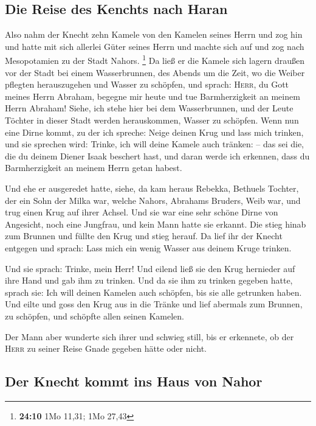 \hypertarget{die-reise-des-kenchts-nach-haran}{%
\subsection{Die Reise des Kenchts nach
Haran}\label{die-reise-des-kenchts-nach-haran}}

 Also nahm der Knecht zehn Kamele von den Kamelen seines
Herrn und zog hin und hatte mit sich allerlei Güter seines Herrn und
machte sich auf und zog nach Mesopotamien zu der Stadt Nahors.
\footnote{\textbf{24:10} 1Mo 11,31; 1Mo 27,43}  Da ließ
er die Kamele sich lagern draußen vor der Stadt bei einem Wasserbrunnen,
des Abends um die Zeit, wo die Weiber pflegten herauszugehen und Wasser
zu schöpfen,  und sprach: \textsc{Herr}, du Gott meines
Herrn Abraham, begegne mir heute und tue Barmherzigkeit an meinem Herrn
Abraham!  Siehe, ich stehe hier bei dem Wasserbrunnen,
und der Leute Töchter in dieser Stadt werden herauskommen, Wasser zu
schöpfen.  Wenn nun eine Dirne kommt, zu der ich spreche:
Neige deinen Krug und lass mich trinken, und sie sprechen wird: Trinke,
ich will deine Kamele auch tränken: -- das sei die, die du deinem Diener
Isaak beschert hast, und daran werde ich erkennen, dass du
Barmherzigkeit an meinem Herrn getan habest.

 Und ehe er ausgeredet hatte, siehe, da kam heraus
Rebekka, Bethuels Tochter, der ein Sohn der Milka war, welche Nahors,
Abrahams Bruders, Weib war, und trug einen Krug auf ihrer Achsel.
 Und sie war eine sehr schöne Dirne von Angesicht, noch
eine Jungfrau, und kein Mann hatte sie erkannt. Die stieg hinab zum
Brunnen und füllte den Krug und stieg herauf.  Da lief
ihr der Knecht entgegen und sprach: Lass mich ein wenig Wasser aus
deinem Kruge trinken.

 Und sie sprach: Trinke, mein Herr! Und eilend ließ sie
den Krug hernieder auf ihre Hand und gab ihm zu trinken. 
Und da sie ihm zu trinken gegeben hatte, sprach sie: Ich will deinen
Kamelen auch schöpfen, bis sie alle getrunken haben.  Und
eilte und goss den Krug aus in die Tränke und lief abermals zum Brunnen,
zu schöpfen, und schöpfte allen seinen Kamelen.

 Der Mann aber wunderte sich ihrer und schwieg still, bis
er erkennete, ob der \textsc{Herr} zu seiner Reise Gnade gegeben hätte
oder nicht.

\hypertarget{der-knecht-kommt-ins-haus-von-nahor}{%
\subsection{Der Knecht kommt ins Haus von
Nahor}\label{der-knecht-kommt-ins-haus-von-nahor}}

